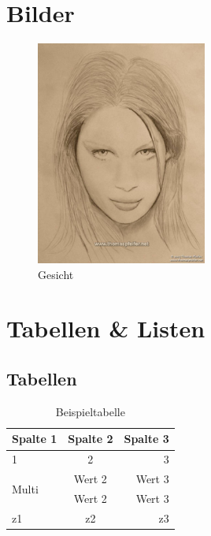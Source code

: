 \section{Bilder}
\label{sec:Bilder}

\lipsum[1]
\begin{figure}[h]
	\centering
		\includegraphics[width=0.50\textwidth]{bilder.jpg}
	\caption{Gesicht}
	\label{fig:bilder}
\end{figure}
\lipsum[1-2]

\section{Tabellen \& Listen}
\label{sec:TabellenListen}

\subsection{Tabellen}
\label{sec:Tabellen}

\begin{table}[h]
	\centering
		\begin{tabular}{|l|c|r|}
			\hline
			\textbf{Spalte 1} & \textbf{Spalte 2} & \textbf{Spalte 3}\\
			\hline
			1 & 2 & 3 \\
			\hline
			\multirow{2}{*}{Multi}
				& Wert 2 & Wert 3 \\
				& Wert 2 & Wert 3 \\
			\hline
			z1 & z2 & z3 \\
			\hline
		\end{tabular}
	\caption{Beispieltabelle}
	\label{tab:Beispieltabelle}
\end{table}


